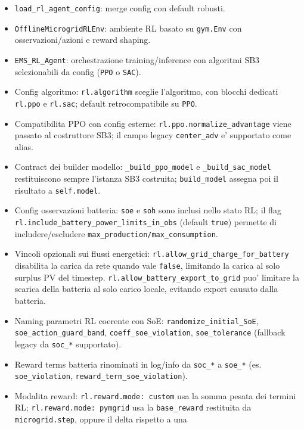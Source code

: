 \begin{itemize}[leftmargin=1.2cm]
\item \texttt{load\_rl\_agent\_config}: merge config con default robusti.
\item \texttt{OfflineMicrogridRLEnv}: ambiente RL basato su \texttt{gym.Env} con osservazioni/azioni e
  reward shaping.
\item \texttt{EMS\_RL\_Agent}: orchestrazione training/inference con algoritmi SB3
  selezionabili da config (\texttt{PPO} o \texttt{SAC}).
\item Config algoritmo:
  \texttt{rl.algorithm} sceglie l'algoritmo, con blocchi dedicati
  \texttt{rl.ppo} e \texttt{rl.sac}; default retrocompatibile su \texttt{PPO}.
\item Compatibilita PPO con config esterne:
  \texttt{rl.ppo.normalize\_advantage} viene passato al costruttore SB3;
  il campo legacy \texttt{center\_adv} e' supportato come alias.
\item Contract dei builder modello:
  \texttt{\_build\_ppo\_model} e \texttt{\_build\_sac\_model} restituiscono sempre
  l'istanza SB3 costruita; \texttt{build\_model} assegna poi il risultato a
  \texttt{self.model}.
\item Config osservazioni batteria:
  \texttt{soe} e \texttt{soh} sono inclusi nello stato RL; il flag
  \texttt{rl.include\_battery\_power\_limits\_in\_obs} (default \texttt{true}) permette di
  includere/escludere \texttt{max\_production/max\_consumption}.
\item Vincoli opzionali sui flussi energetici:
  \texttt{rl.allow\_grid\_charge\_for\_battery} disabilita la carica da rete quando vale
  \texttt{false}, limitando la carica al solo surplus PV del timestep.
  \texttt{rl.allow\_battery\_export\_to\_grid} puo' limitare la scarica della batteria
  al solo carico locale, evitando export causato dalla batteria.
\item Naming parametri RL coerente con SoE:
  \texttt{randomize\_initial\_SoE}, \texttt{soe\_action\_guard\_band},
  \texttt{coeff\_soe\_violation}, \texttt{soe\_tolerance} (fallback legacy da \texttt{soc\_*} supportato).
\item Reward terms batteria rinominati in log/info da \texttt{soc\_*} a \texttt{soe\_*}
  (es. \texttt{soe\_violation}, \texttt{reward\_term\_soe\_violation}).
\item Modalita reward:
  \texttt{rl.reward.mode: custom} usa la somma pesata dei termini RL;
  \texttt{rl.reward.mode: pymgrid} usa la \texttt{base\_reward}
  restituita da \texttt{microgrid.step}, oppure il delta rispetto a una

\end{itemize}

